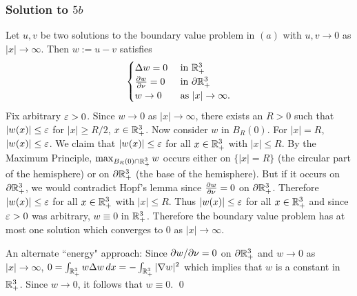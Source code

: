 \subsubsection*{Solution to $5b$}
Let $u, v$ be two solutions to the boundary value problem in $(a)$ with $u, v \rightarrow 0$ as $|x| \rightarrow \infty$. Then
$w := u - v$ satisfies
\begin{align*}
\begin{cases}
\Delta w = 0 & \text{ in } \mathbb{R}^{3}_{+}\\
\frac{\partial w}{\partial \nu} = 0 & \text{ in } \partial \mathbb{R}^{3}_{+}\\
w \rightarrow 0 & \text{ as } |x| \rightarrow \infty.
\end{cases}
\end{align*}
Fix arbitrary $\varepsilon > 0$. Since $w \rightarrow 0$ as $|x| \rightarrow \infty$, there exists an $R > 0$ such that
$|w(x)| \leq \varepsilon$ for $|x| \geq R/2$, $x \in \mathbb{R}^{3}_{+}$. Now consider $w$ in $B_{R}(0)$. For $|x| = R$, $|w(x)| \leq \varepsilon$. We claim that $|w(x)| \leq \varepsilon$
for all $x \in \mathbb{R}^{3}_{+}$ with $|x| \leq R$. By the Maximum Principle, $\max_{B_{R}(0) \cap \mathbb{R}^{3}_{+}}w$ occurs either on $\{|x| = R\}$ (the circular part of the hemisphere)
or on $\partial \mathbb{R}_{+}^{3}$ (the base of the hemisphere). But if it occurs on $\partial\mathbb{R}_{+}^{3}$, we would contradict Hopf's lemma since
$\frac{\partial w}{\partial \nu} = 0$ on $\partial \mathbb{R}^{3}_{+}$. Therefore $|w(x)| \leq \varepsilon$ for all $x \in \mathbb{R}^{3}_{+}$ with $|x| \leq R$. Thus $|w(x)| \leq \varepsilon$
for all $x \in \mathbb{R}^{3}_{+}$ and since $\varepsilon > 0$ was arbitrary, $w \equiv 0 $ in $\mathbb{R}^{3}_{+}$. Therefore the boundary value problem has at most one solution
which converges to $0$ as $|x| \rightarrow \infty$.
\begin{rem}
An alternate ``energy" approach: Since $\partial w/\partial \nu = 0$ on $\partial \mathbb{R}^{3}_{+}$ and $w \rightarrow 0$ as $|x| \rightarrow \infty$,
$0 = \int_{\mathbb{R}^{3}_{+}}w\Delta w\, dx = -\int_{\mathbb{R}^{3}_{+}}|\nabla w|^{2}$ which implies that $w$ is a constant in $\mathbb{R}^{3}_{+}$. Since $w \rightarrow 0$, it follows that $w \equiv 0$.
\hfill\qed
\end{rem}

